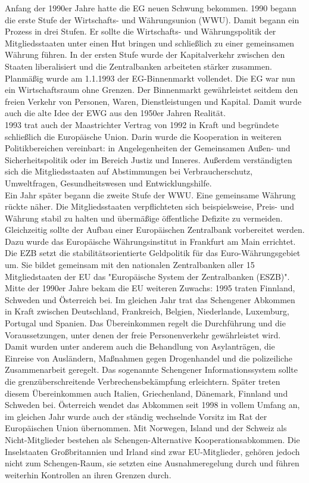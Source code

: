 \documentclass[letterpaper, 12pt]{article}
\begin{document}
Anfang der 1990er Jahre hatte die EG neuen Schwung bekommen. 1990 begann die erste Stufe der Wirtschafts- und Währungsunion (WWU). Damit begann ein Prozess in drei Stufen. Er sollte die Wirtschafts- und Währungspolitik der Mitgliedsstaaten unter einen Hut bringen und schließlich zu einer gemeinsamen Währung führen. In der ersten Stufe wurde der Kapitalverkehr zwischen den Staaten liberalisiert und die Zentralbanken arbeiteten stärker zusammen. \\
Planmäßig wurde am 1.1.1993 der EG-Binnenmarkt vollendet. Die EG war nun ein Wirtschaftsraum ohne Grenzen. Der Binnenmarkt gewährleistet seitdem den freien Verkehr von Personen, Waren, Dienstleistungen und Kapital. Damit wurde auch die alte Idee der EWG aus den 1950er Jahren Realität. \\
1993 trat auch der Maastrichter Vertrag von 1992 in Kraft und begründete schließlich die Europäische Union. Darin wurde die Kooperation in weiteren Politikbereichen vereinbart: in Angelegenheiten der Gemeinsamen Außen- und Sicherheitspolitik oder im Bereich Justiz und Inneres. Außerdem verständigten sich die Mitgliedsstaaten auf Abstimmungen bei Verbraucherschutz, Umweltfragen, Gesundheitswesen und Entwicklungshilfe. \\
Ein Jahr später begann die zweite Stufe der WWU. Eine gemeinsame Währung rückte näher. Die Mitgliedsstaaten verpflichteten sich beispielsweise, Preis- und Währung stabil zu halten und übermäßige öffentliche Defizite zu vermeiden. Gleichzeitig sollte der Aufbau einer Europäischen Zentralbank vorbereitet werden. Dazu wurde das Europäische Währungsinstitut in Frankfurt am Main errichtet. Die EZB setzt die stabilitätsorientierte Geldpolitik für das Euro-Währungsgebiet um. Sie bildet gemeinsam mit den nationalen Zentralbanken aller 15 Mitgliedstaaten der EU das "Europäische System der Zentralbanken (ESZB)". \\
Mitte der 1990er Jahre bekam die EU weiteren Zuwachs: 1995 traten Finnland, Schweden und Österreich bei. Im gleichen Jahr trat das Schengener Abkommen in Kraft zwischen Deutschland, Frankreich, Belgien, Niederlande, Luxemburg, Portugal und Spanien. Das Übereinkommen regelt die Durchführung und die Voraussetzungen, unter denen der freie Personenverkehr gewährleistet wird. Damit wurden unter anderem auch die Behandlung von Asylanträgen, die Einreise von Ausländern, Maßnahmen gegen Drogenhandel und die polizeiliche Zusammenarbeit geregelt. Das sogenannte Schengener Informationssystem sollte die grenzüberschreitende Verbrechensbekämpfung erleichtern. Später treten diesem Übereinkommen auch Italien, Griechenland, Dänemark, Finnland und Schweden bei. Österreich wendet das Abkommen seit 1998 in vollem Umfang an, im gleichen Jahr wurde auch der ständig wechselnde Vorsitz im Rat der Europäischen Union übernommen. Mit Norwegen, Island und der Schweiz als Nicht-Mitglieder bestehen als Schengen-Alternative Kooperationsabkommen. Die Inselstaaten Großbritannien und Irland sind zwar EU-Mitglieder, gehören jedoch nicht zum Schengen-Raum, sie setzten eine Ausnahmeregelung durch und führen weiterhin Kontrollen an ihren Grenzen durch. \\
\end{document}
